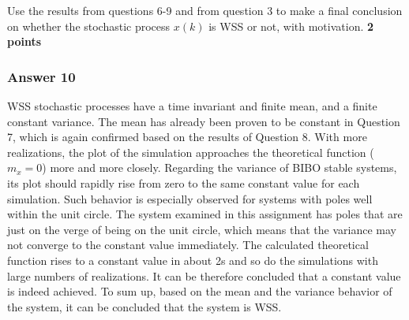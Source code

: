 \documentclass[11pt]{article}
\begin{document}
Use the results from questions 6-9 and from question 3 to make a final
conclusion on whether the stochastic process \(x(k)\) is WSS or not,
with motivation. \textbf{2 points}

    \hypertarget{answer-10}{%
\subsubsection{Answer 10}\label{answer-10}}

WSS stochastic processes have a time invariant and finite mean, and a
finite constant variance. The mean has already been proven to be
constant in Question 7, which is again confirmed based on the results of
Question 8. With more realizations, the plot of the simulation
approaches the theoretical function (\(m_x = 0\)) more and more closely.
Regarding the variance of BIBO stable systems, its plot should rapidly
rise from zero to the same constant value for each simulation. Such
behavior is especially observed for systems with poles well within the
unit circle. The system examined in this assignment has poles that are
just on the verge of being on the unit circle, which means that the
variance may not converge to the constant value immediately. The
calculated theoretical function rises to a constant value in about 2s
and so do the simulations with large numbers of realizations. It can be
therefore concluded that a constant value is indeed achieved. To sum up,
based on the mean and the variance behavior of the system, it can be
concluded that the system is WSS.


    
    
    
\end{document}
